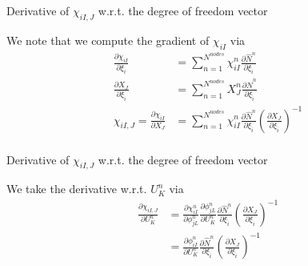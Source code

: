 \documentclass[11pt]{beamer}
\begin{document}
\begin{frame}{Derivative of $\chi_{iI,J}$ w.r.t. the degree of freedom vector}

We note that we compute the gradient of $\chi_{iI}$ via
\begin{align*}
\frac{\partial \chi_{iI}}{\partial \xi_{\hat{i}}} &= \sum_{n=1}^{N^{nodes}} \chi_{iI}^n \frac{\partial \hat{N}^n}{\partial \xi_{\hat{i}}}\\
\frac{\partial X_J}{\partial \xi_{\hat{i}}} &= \sum_{n=1}^{N^{nodes}} X_J^n \frac{\partial \hat{N}^n}{\partial \xi_{\hat{i}}}\\
\chi_{iI,J} = \frac{\partial \chi_{iI}}{\partial X_J} &= \sum_{n=1}^{N^{nodes}} \chi_{iI}^n \frac{\partial \hat{N}^n}{\partial \xi_{\hat{i}}}\left(\frac{\partial X_J}{\partial \xi_{\hat{i}}}\right)^{-1}\\
\end{align*}

\end{frame}

\begin{frame}{Derivative of $\chi_{iI,J}$ w.r.t. the degree of freedom vector}

We take the derivative w.r.t. $U_K^n$ via
\begin{align*}
\frac{\partial \chi_{iI,J}}{\partial U_K^n} &=  \frac{\partial \chi_{iI}^n}{\partial \phi_{jL}^n} \frac{\partial \phi_{jL}^n}{\partial U_K^n} \frac{\partial \hat{N}^n}{\partial \xi_{\hat{i}}}\left(\frac{\partial X_J}{\partial \xi_{\hat{i}}}\right)^{-1}\\
&= \frac{\partial \phi_{iI}^n}{\partial U_K^n} \frac{\partial \hat{N}^n}{\partial \xi_{\hat{i}}}\left(\frac{\partial X_J}{\partial \xi_{\hat{i}}}\right)^{-1}\\
\end{align*}

\end{frame}
\end{document}
